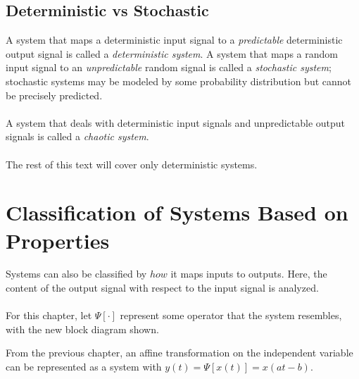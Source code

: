 \documentclass{report}
\begin{document}
\subsection{Deterministic vs Stochastic}
A system that maps a deterministic input signal to a \emph{predictable} deterministic output signal is called a \emph{deterministic system}. A system that maps a random input signal 
to an \emph{unpredictable} random signal is called a \emph{stochastic system}; stochastic systems may be modeled by some probability distribution but cannot be precisely predicted. \\ \\ 
A system that deals with deterministic input signals and unpredictable output signals is called a \emph{chaotic system}.
\\ \\
The rest of this text will cover only deterministic systems.

\section{Classification of Systems Based on Properties}
Systems can also be classified by $how$ it maps inputs to outputs. Here, the content of the output signal with respect to the input signal is analyzed.
\\ \\
For this chapter, let $\Psi[\cdot]$ represent some operator that the system resembles, with the new block diagram shown.
\begin{center}
\end{center}
From the previous chapter, an affine transformation on the independent variable can be represented as a system with $y(t)=\Psi[x(t)]=x(at-b)$.
\end{document}
